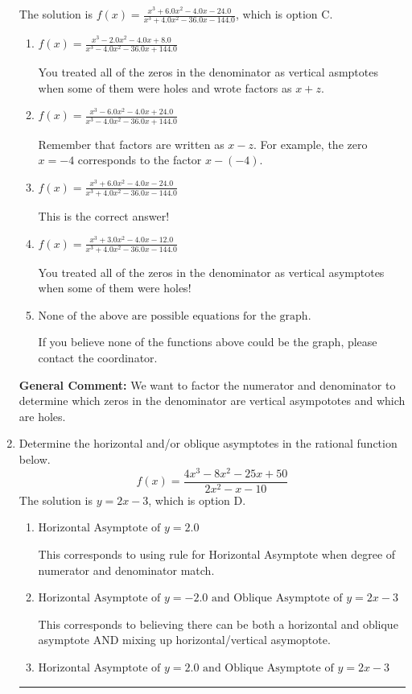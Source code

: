 \documentclass{extbook}[14pt]
\newcommand{\litem}[1]{\item #1

\rule{\textwidth}{0.4pt}}
\begin{document}
\begin{enumerate}
{The solution is \( f(x)=\frac{x^{3} +6.0 x^{2} -4.0 x -24.0}{x^{3} +4.0 x^{2} -36.0 x -144.0} \), which is option C.\begin{enumerate}[label=\Alph*.]
\item \( f(x)=\frac{x^{3} -2.0 x^{2} -4.0 x + 8.0}{x^{3} -4.0 x^{2} -36.0 x + 144.0} \)

You treated all of the zeros in the denominator as vertical asmptotes when some of them were holes and wrote factors as $x+z$.
\item \( f(x)=\frac{x^{3} -6.0 x^{2} -4.0 x + 24.0}{x^{3} -4.0 x^{2} -36.0 x + 144.0} \)

Remember that factors are written as $x-z$. For example, the zero $x=-4$ corresponds to the factor $x-(-4)$.
\item \( f(x)=\frac{x^{3} +6.0 x^{2} -4.0 x -24.0}{x^{3} +4.0 x^{2} -36.0 x -144.0} \)

This is the correct answer!
\item \( f(x)=\frac{x^{3} +3.0 x^{2} -4.0 x -12.0}{x^{3} +4.0 x^{2} -36.0 x -144.0} \)

You treated all of the zeros in the denominator as vertical asymptotes when some of them were holes!
\item \( \text{None of the above are possible equations for the graph.} \)

If you believe none of the functions above could be the graph, please contact the coordinator.
\end{enumerate}

\textbf{General Comment:} We want to factor the numerator and denominator to determine which zeros in the denominator are vertical asympototes and which are holes.
}
\litem{
Determine the horizontal and/or oblique asymptotes in the rational function below.
\[ f(x) = \frac{4x^{3} -8 x^{2} -25 x + 50}{2x^{2} -x -10} \]The solution is \( y = 2x -3 \), which is option D.\begin{enumerate}[label=\Alph*.]
\item \( \text{Horizontal Asymptote of } y = 2.0  \)

This corresponds to using rule for Horizontal Asymptote when degree of numerator and denominator match.
\item \( \text{Horizontal Asymptote of } y = -2.0 \text{ and Oblique Asymptote of } y = 2x -3 \)

This corresponds to believing there can be both a horizontal and oblique asymptote AND mixing up horizontal/vertical asymoptote.
\item \( \text{Horizontal Asymptote of } y = 2.0 \text{ and Oblique Asymptote of } y = 2x -3 \)


\end{enumerate}}
\end{enumerate}
\end{document}
